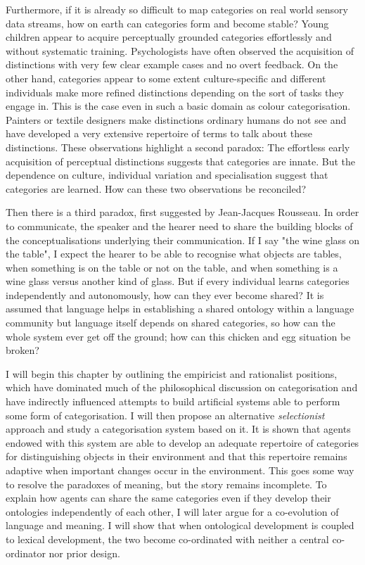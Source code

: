Furthermore, if it is already so difficult to map
categories on real world sensory data streams, how 
on earth can categories form and become stable? 
Young children appear to acquire perceptually 
grounded categories effortlessly and without systematic 
training. Psychologists have often observed the 
acquisition of distinctions
with very few clear example cases and no overt feedback. 
On the other hand, categories appear to 
some extent culture-specific and different 
individuals make more refined distinctions depending
on the sort of tasks they engage in. This is 
the case even in such a basic domain as colour categorisation. 
Painters or textile designers make distinctions ordinary 
humans do not see and have developed a very extensive
repertoire of terms to talk about these distinctions. 
These observations highlight a second paradox: The 
effortless early acquisition of perceptual distinctions 
suggests that categories 
are innate. But the dependence on culture, individual
variation and specialisation suggest that categories
are learned. How can these two observations be reconciled? 

Then there is a third paradox, first suggested
by Jean-Jacques Rousseau. In order to communicate,
the speaker and the hearer need to share the building
blocks of the conceptualisations underlying their communication. 
If I say "the wine glass on the table", I expect 
the hearer to be able to recognise what objects are 
tables, when something is on the table or not on the table, and 
when something is a wine glass versus another kind 
of glass. But if every individual learns categories independently
and autonomously, how can they ever become shared? It is 
assumed that language helps in establishing a shared ontology within 
a language community but language itself depends on 
shared categories, so how can the whole system ever 
get off the ground; how can this chicken and egg situation
be broken?

I will begin this chapter by outlining the empiricist 
and rationalist positions, which have 
dominated much of the philosophical discussion on 
categorisation and have indirectly influenced attempts 
to build artificial systems able to perform some form
of categorisation. 
I will then propose an alternative {\itshape selectionist} approach
and study a categorisation system based on it. It is 
shown that agents endowed with this system are able
to develop an adequate repertoire of categories for 
distinguishing objects in their environment and that 
this repertoire remains adaptive when important changes 
occur in the environment. This goes some way to 
resolve the paradoxes of meaning, but the story remains
incomplete. To explain how agents can share the same 
categories even if they develop their ontologies 
independently of each other, I will later argue for
a co-evolution of language and meaning. I will show
that when ontological development is coupled to lexical 
development, the two become co-ordinated with neither
a central co-ordinator nor prior design. 

